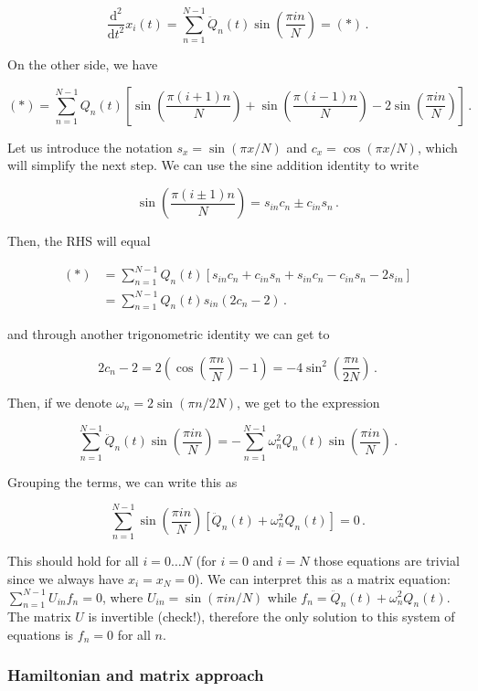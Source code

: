 \documentclass[
]{article}
\begin{document}
\[ \frac{\text{d}^2}{\text{d}t^2} x_i(t) = \sum_{n=1}^{N-1} \ddot{Q}_n(t) \sin\left( \frac{\pi i n}{N}\right) = (*)\,.
\]

On the other side, we have

\[ (*) = \sum_{n=1}^{N-1} Q_n(t) \left[ \sin\left( \frac{\pi (i+1) n}{N}\right) + \sin\left( \frac{\pi (i-1) n}{N}\right) - 2 \sin\left( \frac{\pi i n}{N}\right) \right]\,.
\]

Let us introduce the notation \(s_{x} = \sin ( \pi x / N)\) and
\(c_{x} = \cos ( \pi x / N)\), which will simplify the next step. We can
use the sine addition identity to write

\[ \sin\left( \frac{\pi (i \pm 1) n}{N}\right)
= s_{in} c_n \pm c_{in} s_n\,.
\]

Then, the RHS will equal

 
\begin{align}
(*) &= \sum_{n=1}^{N-1}
Q_n(t) \left[ 
    s_{in} c_n + c_{in} s_n 
    +
    s_{in} c_n - c_{in} s_n 
    - 2 s_{in}
 \right] \\
 &= \sum_{n=1}^{N-1} Q_n(t) s_{in} (2c_n - 2)\,.
\end{align}

and through another trigonometric identity we can get to

\[ 2 c_n - 2 = 2 (\cos \left( \frac{\pi n}{N}\right) - 1) = - 4 \sin^2 \left( \frac{\pi n}{2N}\right)\,.
\]

Then, if we denote \(\omega_n = 2 \sin (\pi n / 2N)\), we get to the
expression

\[ \sum_{n=1}^{N-1} \ddot{Q}_n (t) \sin\left( \frac{\pi i n}{N}\right) = -\sum_{n=1}^{N-1} \omega_n^2 Q_n(t) \sin\left( \frac{\pi i n}{N}\right)\,.
\]

Grouping the terms, we can write this as

\[ \sum_{n=1}^{N-1} \sin\left( \frac{\pi i n}{N}\right) \left[ \ddot{Q}_n (t) + \omega_n^2 Q_n(t) \right]  = 0\,.
\]

This should hold for all \(i = 0\dots N\) (for \(i=0\) and \(i=N\) those
equations are trivial since we always have \(x_i=x_N=0\)). We can
interpret this as a matrix equation: \(\sum_{n=1}^{N-1} U_{in}f_{n}=0\),
where \(U_{in} = \sin(\pi i n / N)\) while
\(f_{n} = \ddot{Q}_n (t) + \omega_n^2 Q_n(t)\). The matrix \(U\) is
invertible (check!), therefore the only solution to this system of
equations is \(f_{n}=0\) for all \(n\).

\subsubsection{Hamiltonian and matrix
approach}\label{hamiltonian-and-matrix-approach}
\end{document}
